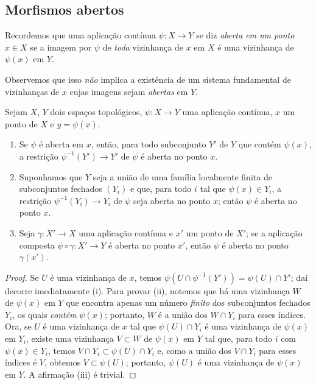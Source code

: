 \subsection{Morfismos abertos}
\label{subsection:IV.14.1}

\begin{env}[14.1.1]
\label{IV.14.1.1}
Recordemos  que uma aplicação contínua $\psi:X\to Y$ se diz \emph{aberta em um ponto} $x\in X$ se a imagem por $\psi$ de \emph{toda} vizinhança de $x$ em $X$ é uma vizinhança de $\psi(x)$ em $Y$.

Observemos que isso \emph{não} implica a existência de um sistema fundamental de vizinhanças de $x$ cujas imagens sejam \emph{abertas} em $Y$.
\end{env}

\begin{proposition}[14.1.2]
\label{IV.14.1.2}
Sejam $X$, $Y$ dois espaços topológicos, $\psi:X\to Y$ uma aplicação contínua, $x$ um ponto de $X$ e $y=\psi(x)$.
\begin{enumerate}[label=(\roman*)]
  \item Se $\psi$ é aberta em $x$, então, para todo subconjunto $Y'$ de $Y$ que contém $\psi(x)$, a restrição $\psi^{-1}(Y')\to Y'$ de $\psi$ é aberta no ponto $x$.
  \item Suponhamos que $Y$ seja a união de uma família localmente finita de subconjuntos fechados $(Y_i)$ e que, para todo $i$ tal que $\psi(x)\in Y_i$, a restrição $\psi^{-1}(Y_i)\to Y_i$ de $\psi$ seja aberta no ponto $x$; então $\psi$ é aberta no ponto $x$.
  \item Seja $\gamma:X'\to X$ uma aplicação contínua e $x'$ um ponto de $X'$; se a aplicação composta $\psi\circ\gamma:X'\to Y$ é aberta no ponto $x'$, então $\psi$ é aberta no ponto $\gamma(x')$.
\end{enumerate}
\end{proposition}

\begin{proof}
Se $U$ é uma vizinhança de $x$, temos $\psi(U\cap\psi^{-1}(Y'))=\psi(U)\cap Y'$; daí decorre imediatamente (i).
Para provar (ii), notemos que há uma vizinhança $W$ de $\psi(x)$ em $Y$ que encontra apenas um número \emph{finito} dos subconjuntos fechados $Y_i$, os quais \emph{contêm} $\psi(x)$; portanto, $W$ é a união dos $W\cap Y_i$ para esses índices.
Ora, se $U$ é uma vizinhança de $x$ tal que $\psi(U)\cap Y_i$ é uma vizinhança de $\psi(x)$ em $Y_i$, existe uma vizinhança $V\subset W$ de $\psi(x)$ em $Y$ tal que, para todo $i$ com $\psi(x)\in Y_i$,
temos $V\cap Y_i\subset\psi(U)\cap Y_i$ e, como a união dos $V\cap Y_i$ para esses índices é $V$, obtemos $V\subset\psi(U)$; portanto, $\psi(U)$ é uma vizinhança de $\psi(x)$ em $Y$.
A afirmação (iii) é trivial.
\end{proof}

